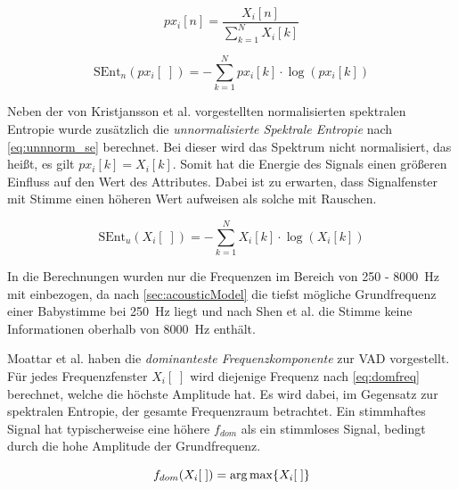 \begin{equation}
px_i[n] = \frac{X_i[n]}{\sum_{k=1}^{N} X_i[k]}
\label{eq:norm_spek}
\end{equation}

\begin{equation}
\text{SEnt}_n(px_i[\;]) = -\sum_{k=1}^{N}px_i[k] \cdot\log(px_i[k])
\label{eq:norm_se}
\end{equation}

Neben der von Kristjansson et al. \cite{vad_Lisboa} vorgestellten normalisierten spektralen Entropie wurde zusätzlich die \emph{unnormalisierte Spektrale Entropie} nach \autoref{eq:unnnorm_se} berechnet. Bei dieser wird das Spektrum nicht normalisiert, das heißt, es gilt $px_i[k] = X_i[k]$. Somit hat die Energie des Signals einen größeren Einfluss auf den Wert des Attributes. Dabei ist zu erwarten, dass Signalfenster mit Stimme einen höheren Wert aufweisen als solche mit Rauschen.


\begin{equation}
\text{SEnt}_u(X_i[\;]) = -\sum_{k=1}^{N}X_i[k] \cdot\log(X_i[k])
\label{eq:unnnorm_se}
\end{equation}

In die Berechnungen wurden nur die Frequenzen im Bereich von 250 - \SI{8000}{\hertz} mit einbezogen, da nach \autoref{sec:acousticModel} die tiefst mögliche Grundfrequenz einer Babystimme bei \SI{250}{\hertz} liegt und nach Shen et al. \cite{vad_entropie02} die Stimme keine Informationen oberhalb von \SI{8000}{\hertz} enthält.

Moattar et al. \cite[S. 2550]{vad_Easy} haben die \emph{dominanteste Frequenzkomponente} zur VAD vorgestellt. Für jedes Frequenzfenster $X_i[\;]$ wird diejenige Frequenz nach  \autoref{eq:domfreq} berechnet, welche die höchste Amplitude hat. Es wird dabei, im Gegensatz zur spektralen Entropie, der gesamte Frequenzraum betrachtet. Ein stimmhaftes Signal hat typischerweise eine höhere $f_{dom}$ als ein stimmloses Signal, bedingt durch die hohe Amplitude der Grundfrequenz.\cite[S. 2550]{vad_Easy}

\begin{equation}
f_{dom}(X_i[\;]) = \operatorname*{arg\,max} \{X_i[\;]\}
\label{eq:domfreq}
\end{equation}


